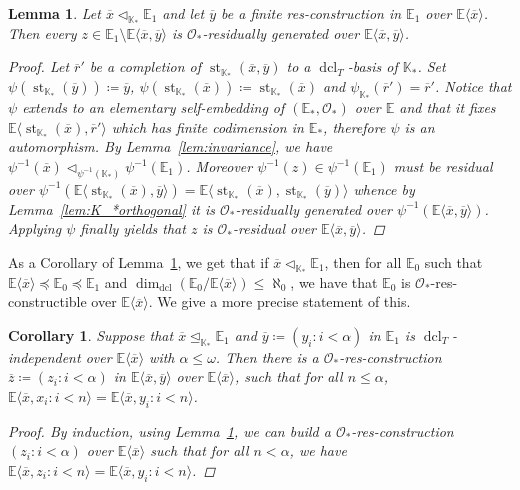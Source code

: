 \documentclass{amsart}
\newtheorem{lemma}[theorem]{Lemma}
\newtheorem{corollary}[theorem]{Corollary}
\theoremstyle{remark}
\theoremstyle{definition}
\theoremstyle{plain}
\newcommand{\bE}{\mathbb E}
\newcommand{\bK}{\mathbb K}
\newcommand{\cO}{\mathcal O}
\DeclareMathOperator{\std}{\mathrm{st}}
\DeclareMathOperator{\dcl}{\mathrm{dcl}}
\theoremstyle{plain}
\begin{document}
\begin{lemma}\label{lem:toname}
    Let $\overline{x} \triangleleft_{\bK_*} \bE_1$ and let $\overline{y}$ be a finite res-construction in $\bE_1$ over $\bE \langle \overline{x} \rangle$. Then every $z \in \bE_1 \setminus \bE \langle \overline{x}, \overline{y}\rangle$ is $\cO_*$-residually generated over $\bE \langle \overline{x}, \overline{y}\rangle$.
    \begin{proof}
        Let $\overline{r}'$ be a completion of $\std_{\bK_*}(\overline{x},\overline{y})$ to a $\dcl_T$-basis of $\bK_*$. Set $\psi(\std_{\bK_*}(\overline{y}))\coloneqq \overline{y}$, $\psi(\std_{\bK_*}(\overline{x}))\coloneqq \std_{\bK_*}(\overline{x})$ and $\psi_{\bK_*}(\overline{r}')=\overline{r}'$.
        Notice that $\psi$ extends to an elementary self-embedding of $(\bE_*, \cO_*)$ over $\bE$ and that it fixes $\bE\langle \std_{\bK_*}(\overline{x}), \overline{r}' \rangle$ which has finite codimension in $\bE_*$, therefore $\psi$ is an automorphism. By Lemma~\ref{lem:invariance}, we have $\psi^{-1}(\overline{x}) \triangleleft_{\psi^{-1}(\bK_*)} \psi^{-1}(\bE_1)$. Moreover $\psi^{-1}(z) \in \psi^{-1}(\bE_1)$ must be residual over $\psi^{-1}(\bE\langle \std_{\bK_*}(\overline{x}), \overline{y} \rangle)=\bE \langle \std_{\bK_*}(\overline{x}), \std_{\bK_*}(\overline{y})\rangle$ whence by Lemma~\ref{lem:K_*orthogonal} it is $\cO_*$-residually generated over $\psi^{-1}(\bE \langle \overline{x}, \overline{y}\rangle)$. Applying $\psi$ finally yields that $z$ is $\cO_*$-residual over $\bE\langle \overline{x}, \overline{y}\rangle$.
    \end{proof}
\end{lemma}

As a Corollary of Lemma~\ref{lem:toname}, we get that if $\overline{x}\triangleleft_{\bK_*} \bE_1$, then for all $\bE_0$ such that $\bE\langle \overline{x}\rangle \preceq \bE_0\preceq \bE_1$ and $\dim_{\dcl}(\bE_0/\bE\langle \overline{x}\rangle)\le \aleph_0$, we have that $\bE_0$ is $\cO_*$-res-constructible over $\bE\langle \overline{x} \rangle$. We give a more precise statement of this.

\begin{corollary}\label{cor:toname1}
    Suppose that $\overline{x}\trianglelefteq_{\bK_*} \bE_1$ and $\overline{y}\coloneqq (y_i: i< \alpha)$ in $\bE_1$ is $\dcl_T$-independent over $\bE \langle \overline{x}\rangle$ with $\alpha \le \omega$. Then there is a $\cO_*$-res-construction $\overline{z}\coloneqq (z_i : i < \alpha)$ in $\bE \langle \overline{x}, \overline{y}\rangle$ over $\bE \langle \overline{x}\rangle$, such that for all $n\le \alpha$, $\bE \langle \overline{x}, x_i : i <n \rangle = \bE \langle \overline{x}, y_i: i < n\rangle$. 
    \begin{proof}
        By induction, using  Lemma~\ref{lem:toname}, we can build a $\cO_*$-res-construction $(z_i: i< \alpha)$ over $\bE \langle \overline{x}\rangle$ such that for all $n<\alpha$, we have $\bE \langle \overline{x} , z_i: i<n\rangle = \bE \langle \overline{x}, y_i: i<n\rangle$.
    \end{proof}
\end{corollary}
\end{document}
